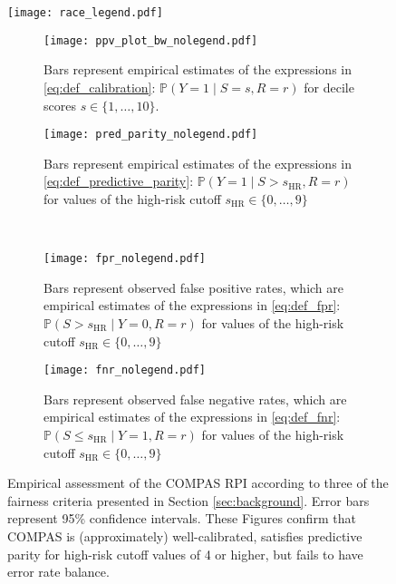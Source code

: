 \documentclass[11pt, svgnames]{article}
\renewcommand{\P}{\mathbb{P}}
\numberwithin{equation}{section}
\theoremstyle{plain}
\theoremstyle{definition}
\numberwithin{prop}{section}
\numberwithin{corollary}{section}
\begin{document}
  
  \begin{figure}[!hb]
   \centering
   \texttt{[image: race\_legend.pdf]} \\
   \begin{subfigure}[t]{0.48\linewidth}
     \texttt{[image: ppv\_plot\_bw\_nolegend.pdf]}
     \caption{Bars represent empirical estimates of the expressions in \eqref{eq:def_calibration}: $\P(Y = 1 \mid S = s, R = r)$ for decile scores $s \in \{1, \ldots, 10\}.$}
   \end{subfigure}
   \hspace{1em}
   \begin{subfigure}[t]{0.48\linewidth}
     \texttt{[image: pred\_parity\_nolegend.pdf]}
     \caption{Bars represent empirical estimates of the expressions in \eqref{eq:def_predictive_parity}: $\P(Y = 1 \mid S > s_\mathrm{HR} , R = r)$ for values of the high-risk cutoff $s_{\mathrm{HR}} \in \{0, \ldots, 9\}$}
   \end{subfigure} \\
   \begin{subfigure}[t]{0.48\linewidth}
     \texttt{[image: fpr\_nolegend.pdf]}
     \caption{Bars represent observed false positive rates, which are empirical estimates of the expressions in \eqref{eq:def_fpr}: $\P(S > s_\mathrm{HR} \mid Y = 0 , R = r)$ for values of the high-risk cutoff $s_{\mathrm{HR}} \in \{0, \ldots, 9\}$}
     \label{subfig:fpr}
   \end{subfigure}
   \hspace{1em}
   \begin{subfigure}[t]{0.48\linewidth}
     \texttt{[image: fnr\_nolegend.pdf]}
     \caption{Bars represent observed false negative rates, which are empirical estimates of the expressions in \eqref{eq:def_fnr}: $\P(S \le s_\mathrm{HR} \mid Y = 1, R = r)$ for values of the high-risk cutoff $s_{\mathrm{HR}} \in \{0, \ldots, 9\}$}
     \label{subfig:fnr}
   \end{subfigure}
 
   \vspace{1em}
   \caption{Empirical assessment of the COMPAS RPI according to three of the fairness criteria presented in Section \ref{sec:background}.  Error bars represent 95\% confidence intervals.  These Figures confirm that COMPAS is (approximately) well-calibrated, satisfies predictive parity for high-risk cutoff values of 4 or higher, but fails to have error rate balance.}
   \label{fig:fairness_assessment}
  \end{figure}
 
\end{document}
